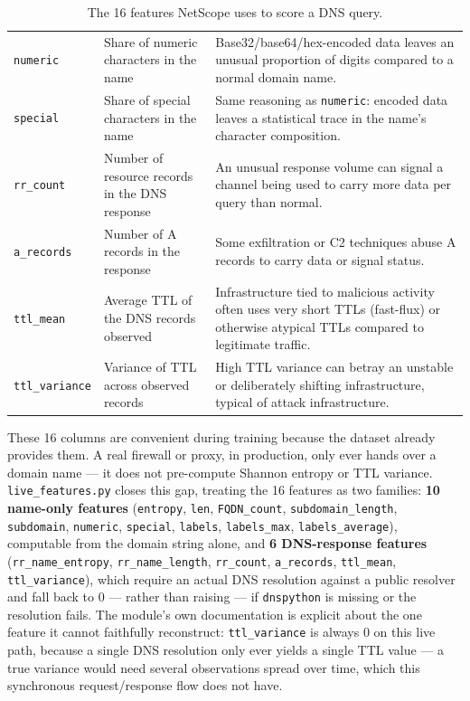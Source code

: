 \documentclass[12pt,a4paper]{report}
\begin{document}
\begin{table}[h]
\begin{tabular}{@{}p{3cm}p{4.8cm}p{5.5cm}@{}}
\texttt{numeric} & Share of numeric characters in the name & Base32/base64/hex-encoded data leaves an unusual proportion of digits compared to a normal domain name. \\

\texttt{special} & Share of special characters in the name & Same reasoning as \texttt{numeric}: encoded data leaves a statistical trace in the name's character composition. \\

\texttt{rr\_count} & Number of resource records in the DNS response & An unusual response volume can signal a channel being used to carry more data per query than normal. \\

\texttt{a\_records} & Number of A records in the response & Some exfiltration or C2 techniques abuse A records to carry data or signal status. \\

\texttt{ttl\_mean} & Average TTL of the DNS records observed & Infrastructure tied to malicious activity often uses very short TTLs (fast-flux) or otherwise atypical TTLs compared to legitimate traffic. \\

\texttt{ttl\_variance} & Variance of TTL across observed records & High TTL variance can betray an unstable or deliberately shifting infrastructure, typical of attack infrastructure. \\
\bottomrule
\end{tabular}
\caption{The 16 features NetScope uses to score a DNS query.}
\end{table}

These 16 columns are convenient during training because the dataset already provides them. A real firewall or proxy, in production, only ever hands over a domain name --- it does not pre-compute Shannon entropy or TTL variance. \texttt{live\_features.py} closes this gap, treating the 16 features as two families: \textbf{10 name-only features} (\texttt{entropy}, \texttt{len}, \texttt{FQDN\_count}, \texttt{subdomain\_length}, \texttt{subdomain}, \texttt{numeric}, \texttt{special}, \texttt{labels}, \texttt{labels\_max}, \texttt{labels\_average}), computable from the domain string alone, and \textbf{6 DNS-response features} (\texttt{rr\_name\_entropy}, \texttt{rr\_name\_length}, \texttt{rr\_count}, \texttt{a\_records}, \texttt{ttl\_mean}, \texttt{ttl\_variance}), which require an actual DNS resolution against a public resolver and fall back to 0 --- rather than raising --- if \texttt{dnspython} is missing or the resolution fails. The module's own documentation is explicit about the one feature it cannot faithfully reconstruct: \texttt{ttl\_variance} is always 0 on this live path, because a single DNS resolution only ever yields a single TTL value --- a true variance would need several observations spread over time, which this synchronous request/response flow does not have.
\end{document}
